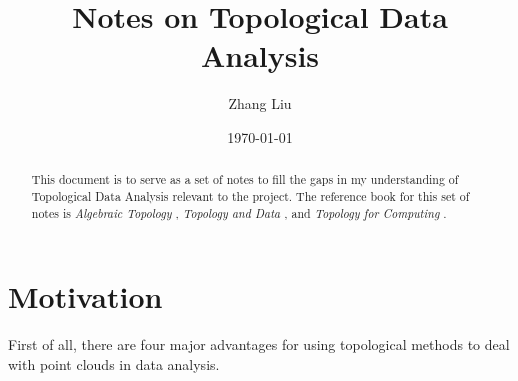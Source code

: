 \documentclass[11pt,reqno,oneside,a4paper]{article}
\author{Zhang Liu}
\title{Notes on Topological Data Analysis}
\date{\today}
\begin{document}
\maketitle
\thispagestyle{fancy}

\begin{abstract}
    This document is to serve as a set of notes to fill the gaps in my understanding of Topological Data Analysis relevant to the project. The reference book for this set of notes is \textit{Algebraic Topology} \cite{Hat2002a}, \textit{Topology and Data} \cite{Car2009a}, and \textit{Topology for Computing} \cite{Zom2005a}.
\end{abstract}


\section{Motivation}

First of all, there are four major advantages for using topological methods to deal with point clouds in data analysis.  
\end{document}
